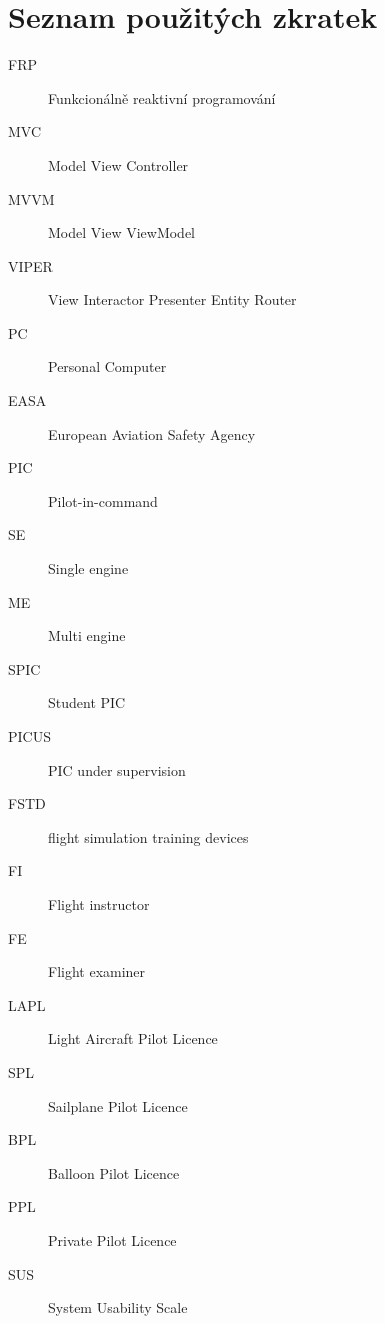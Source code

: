 \documentclass[thesis=M,czech]{FITthesis}[2012/06/26]
\begin{document}
\chapter{Seznam použitých zkratek}
\begin{description}
	\item[FRP] Funkcionálně reaktivní programování
	\item[MVC] Model View Controller
	\item[MVVM] Model View ViewModel
	\item[VIPER] View Interactor Presenter Entity Router
	\item[PC] Personal Computer
	\item[EASA] European Aviation Safety Agency
	\item[PIC] Pilot-in-command
	\item[SE] Single engine
	\item[ME] Multi engine
	\item[SPIC] Student PIC
	\item[PICUS] PIC under supervision
	\item[FSTD] flight simulation training devices
	\item[FI] Flight instructor
	\item[FE] Flight examiner
	\item[LAPL] Light Aircraft Pilot Licence
	\item[SPL] Sailplane Pilot Licence
	\item[BPL] Balloon Pilot Licence
	\item[PPL] Private Pilot Licence
	\item[SUS] System Usability Scale
\end{description}
\end{document}
